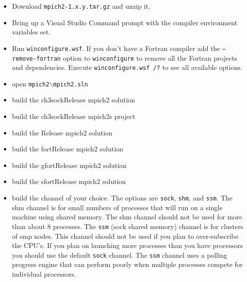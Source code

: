 \documentclass[dvipdfm,11pt]{article}
\begin{document}
\begin{itemize}
\item
Download \texttt{mpich2-1.x.y.tar.gz} and unzip it.
\item
Bring up a Visual Studio Command prompt with the compiler environment 
variables set.
\item
Run \texttt{winconfigure.wsf}. If you don't have a Fortran compiler add the 
\texttt{--remove-fortran} option to \texttt{winconfigure} to remove all the Fortran 
projects and dependencies.  Execute \texttt{winconfigure.wsf /?} to see all
available options.
\item 
    open \texttt{mpich2$\backslash$mpich2.sln}
\item
    build the ch3sockRelease mpich2 solution
\item
    build the ch3sockRelease mpich2s project
\item
    build the Release mpich2 solution
\item
    build the fortRelease mpich2 solution
\item
    build the gfortRelease mpich2 solution
\item
    build the sfortRelease mpich2 solution
\item
    build the channel of your choice.  The options are \texttt{sock},
    \texttt{shm}, and \texttt{ssm}.   
The shm channel is for small numbers of processes that will run on a single 
machine using shared memory.  The shm channel should not be used for more 
than about 8 processes.  The \texttt{ssm} (sock shared memory) channel is for
    clusters  
of smp nodes.  This channel should not be used if you plan to over-subscribe 
the CPU's.  If you plan on launching more processes than you have processors 
you should use the default \texttt{sock} channel.  The \texttt{ssm} channel 
uses a polling progress engine that can perform poorly when multiple processes 
compete for individual processors.  

\end{itemize}
\end{document}

